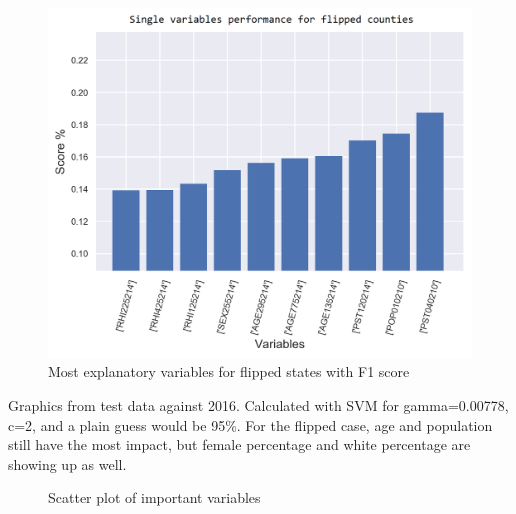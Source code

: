 \begin{figure}[H]
\centering
\includegraphics[scale=0.2]{pictures/results/f1_score.png} 
\caption{Most explanatory variables for flipped states with F1 score}
\end{figure}
Graphics from test data against 2016. Calculated with SVM for gamma=0.00778, c=2, and a plain guess would be 95\%. For the flipped case, age and population still have the most impact, but female percentage and white percentage are showing up as well.

\begin{figure}[H]
\centering
{}
\hfill
{}
\caption{Scatter plot of important variables}
\end{figure}

